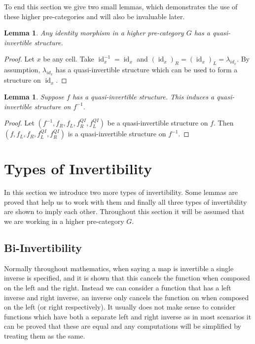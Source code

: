 \documentclass{article}
\newtheorem{lemma}[theorem]{Lemma} \theoremstyle{definition}
\DeclareMathOperator{\id}{id}
\newcommand{\inv}[1]{#1^{-1}} \newcommand{\comp}{\star}
\begin{document}
To end this section we give two small lemmas, which demonstrates the
use of these higher pre-categories and will also be invaluable later.

\begin{lemma}\label{identity}
  Any identity morphism in a higher pre-category \(G\) has a
  quasi-invertible structure.
\end{lemma}

\begin{proof}
  Let \(x\) be any cell. Take \(\inv {\id_x} = \id_x\) and
  \({(\id_x)}_R = {(\id_x)}_L = \lambda_{id_x}\). By assumption,
  \(\lambda_{id_x}\) has a quasi-invertible structure which can be
  used to form a structure on \(\id_x\).
\end{proof}

\begin{lemma}\label{inverse-invert}
  Suppose \(f\) has a quasi-invertible structure. This induces a
  quasi-invertible structure on \(\inv f\).
\end{lemma}

\begin{proof}
  Let \((\inv f, f_R, f_L, f_R^{QI}, f_L^{QI})\) be a quasi-invertible
  structure on \(f\). Then \((f , f_L, f_R, f_L^{QI}, f_R^{QI})\) is a
  quasi-invertible structure on \(\inv f\).
\end{proof}

\section{Types of Invertibility}\label{sec:invertibility}

In this section we introduce two more types of invertibility. Some
lemmas are proved that help us to work with them and finally all three
types of invertibility are shown to imply each other. Throughout this
section it will be assumed that we are working in a higher
pre-category \(G\).

\subsection{Bi-Invertibility}\label{sec:bi-invertibility}

Normally throughout mathematics, when saying a map is invertible a
single inverse is specified, and it is shown that this cancels the
function when composed on the left and the right. Instead we can
consider a function that has a left inverse and right inverse,
an inverse only cancels the function on when composed on the
left (or right respectively). It usually does not make sense to
consider functions which have both a separate left and right inverse
as in most scenarios it can be proved that these are equal and any
computations will be simplified by treating them as the same.
\end{document}
